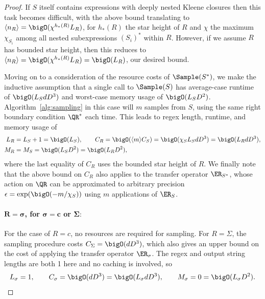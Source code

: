 \begin{proof}
If $S$ itself contains expressions with deeply nested Kleene closures then this task becomes difficult, with the above bound translating to $\langle n_R \rangle = \bigO(\chi^{h_*(R)} L_R)$, for $h_*(R)$ the star height of $R$ and $\chi$ the maximum $\chi_{S_i}$ among all nested subexpressions $(S_i)^*$ within $R$. However, if we assume $R$ has bounded star height, then this reduces to $\langle n_R \rangle = \bigO(\chi^{h_*(R)} L_R) = \bigO(L_R)$, our desired bound.

Moving on to a consideration of the resource costs of $\Sample(S^*)$, we make the inductive assumption that a single call to $\Sample(S)$ has average-case runtime of $\bigO(L_S d D^3)$ and worst-case memory usage of $\bigO(L_S D^2)$. Algorithm~\ref{alg:sampling} 
in this case will $m$ samples from $S$, using the same right boundary condition $\QR^*$ each time. This leads to regex length, runtime, and memory usage of
%
\begin{align*}
    L_R &= L_S + 1 = \bigO(L_S), \qquad C_R = \bigO(\langle m \rangle C_S) = \bigO(\chi_S L_S d D^3) = \bigO(L_R d D^3), \\
    M_R &= M_S = \bigO(L_S D^2) = \bigO(L_R D^2),
\end{align*}
%
where the last equality of $C_R$ uses the bounded star height of $R$. We finally note that the above bound on $C_R$ also applies to the transfer operator $\ER_{S^*}$, whose action on $\QR$ can be approximated to arbitrary precision $\epsilon = \exp(\bigO(-m / \chi_S))$ using $m$ applications of $\ER_S$.

\paragraph{$\mathbf{R = \sigma}$\textbf{, for }$\mathbf{\sigma=c}$\textbf{ or }$\mathbf{\Sigma:}$} For the case of $R = c$, no resources are required for sampling. For $R = \Sigma$, the sampling procedure costs $C_\Sigma = \bigO(d D^3)$, which also gives an upper bound on the cost of applying the transfer operator $\ER_\sigma$. The regex and output string lengths are both 1 here and no caching is involved, so
%
\begin{equation*}
    L_\sigma = 1, \qquad C_\sigma = \bigO(d D^3) = \bigO(L_\sigma d D^3), \qquad M_\sigma = 0 = \bigO(L_\sigma D^2).
\end{equation*}
%

\end{proof}
